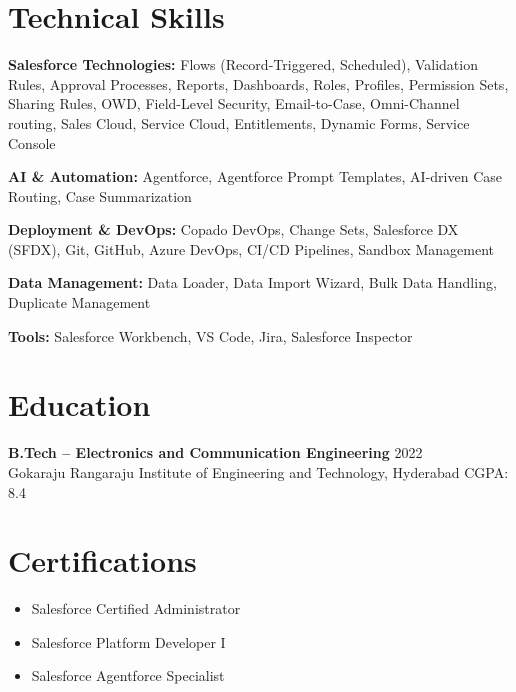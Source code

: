 \documentclass[11pt,a4paper]{article}
\begin{document}
\section*{Technical Skills}

\textbf{Salesforce Technologies:} Flows (Record-Triggered, Scheduled), Validation Rules, Approval Processes, Reports, Dashboards, Roles, Profiles, Permission Sets, Sharing Rules, OWD, Field-Level Security, Email-to-Case, Omni-Channel routing, Sales Cloud, Service Cloud, Entitlements, Dynamic Forms, Service Console

\textbf{AI \& Automation:} Agentforce, Agentforce Prompt Templates, AI-driven Case Routing, Case Summarization

\textbf{Deployment \& DevOps:} Copado DevOps, Change Sets, Salesforce DX (SFDX), Git, GitHub, Azure DevOps, CI/CD Pipelines, Sandbox Management

\textbf{Data Management:} Data Loader, Data Import Wizard, Bulk Data Handling, Duplicate Management

\textbf{Tools:} Salesforce Workbench, VS Code, Jira, Salesforce Inspector

\section*{Education}

\textbf{B.Tech -- Electronics and Communication Engineering} \hfill 2022\\
Gokaraju Rangaraju Institute of Engineering and Technology, Hyderabad \hfill CGPA: 8.4

\section*{Certifications}

\begin{itemize}
\item Salesforce Certified Administrator
\item Salesforce Platform Developer I
\item Salesforce Agentforce Specialist
\end{itemize}
\end{document}
